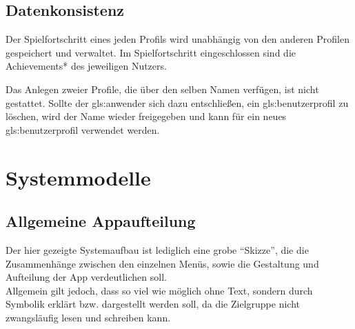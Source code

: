 \documentclass{scrartcl}
\begin{document}
\subsection{Datenkonsistenz}

\begin{telist}[resume]
	\item Der Spielfortschritt eines jeden Profils wird unabhängig von den anderen Profilen gespeichert und verwaltet. Im Spielfortschritt eingeschlossen sind die Achievements* des jeweiligen Nutzers.
	\item Das Anlegen zweier Profile, die über den selben Namen verfügen, ist nicht gestattet. Sollte der \gls{gls:anwender} sich dazu entschließen, ein \gls{gls:benutzerprofil} zu löschen, wird der Name wieder freigegeben und kann für ein neues \gls{gls:benutzerprofil} verwendet werden.
\end{telist}

\clearpage











\section{Systemmodelle}

\subsection{Allgemeine Appaufteilung}

Der hier gezeigte Systemaufbau ist lediglich eine grobe \enquote{Skizze},
die die Zusammenhänge zwischen den einzelnen Menüs, sowie
die Gestaltung und Aufteilung der App verdeutlichen soll.\\
Allgemein gilt jedoch, dass so viel wie möglich ohne Text, sondern durch Symbolik erklärt bzw. dargestellt werden soll, da die Zielgruppe nicht zwangsläufig lesen und schreiben kann.\\
\end{document}
